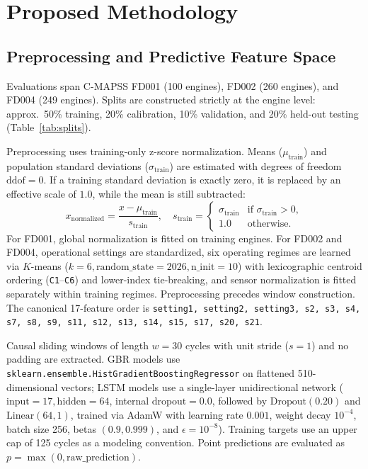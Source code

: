 \section{Proposed Methodology}

\subsection{Preprocessing and Predictive Feature Space}
Evaluations span C-MAPSS FD001 (100 engines), FD002 (260 engines), and FD004 (249 engines). Splits are constructed strictly at the engine level: approx.\ 50\% training, 20\% calibration, 10\% validation, and 20\% held-out testing (Table~\ref{tab:splits}).

Preprocessing uses training-only z-score normalization. Means ($\mu_{\text{train}}$) and population standard deviations ($\sigma_{\text{train}}$) are estimated with degrees of freedom $\text{ddof}=0$. If a training standard deviation is exactly zero, it is replaced by an effective scale of $1.0$, while the mean is still subtracted:
\begin{equation}
x_{\text{normalized}} = \frac{x - \mu_{\text{train}}}{s_{\text{train}}}, \quad s_{\text{train}} = \begin{cases} \sigma_{\text{train}} & \text{if } \sigma_{\text{train}} > 0, \\ 1.0 & \text{otherwise.} \end{cases}
\end{equation}
For FD001, global normalization is fitted on training engines. For FD002 and FD004, operational settings are standardized, six operating regimes are learned via $K$-means ($k=6, \text{random\_state}=2026, \text{n\_init}=10$) with lexicographic centroid ordering (\texttt{C1}--\texttt{C6}) and lower-index tie-breaking, and sensor normalization is fitted separately within training regimes. Preprocessing precedes window construction. The canonical 17-feature order is \texttt{setting1, setting2, setting3, s2, s3, s4, s7, s8, s9, s11, s12, s13, s14, s15, s17, s20, s21}.

Causal sliding windows of length $w = 30$ cycles with unit stride ($s = 1$) and no padding are extracted. GBR models use \texttt{sklearn.ensemble.HistGradientBoostingRegressor} on flattened 510-dimensional vectors; LSTM models use a single-layer unidirectional network ($\text{input}=17, \text{hidden}=64$, internal $\text{dropout}=0.0$, followed by $\text{Dropout}(0.20)$ and $\text{Linear}(64,1)$, trained via AdamW with learning rate $0.001$, weight decay $10^{-4}$, batch size 256, betas $(0.9, 0.999)$, and $\epsilon=10^{-8}$). Training targets use an upper cap of 125 cycles as a modeling convention. Point predictions are evaluated as $p = \max(0, \text{raw\_prediction})$.

